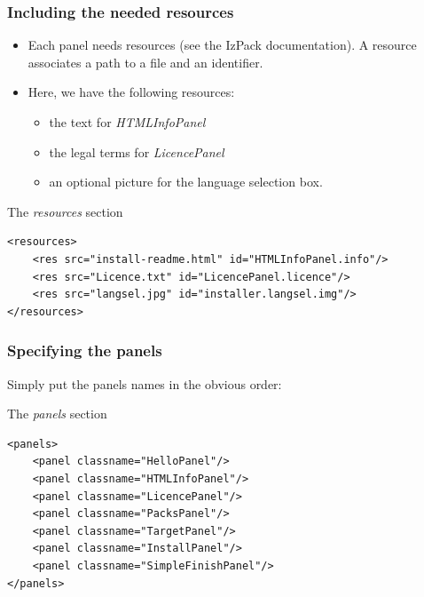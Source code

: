 \documentclass[compress,10pt]{beamer}
\begin{document}

\begin{frame}[containsverbatim]

\frametitle{Including the needed resources}

\begin{itemize}

  \item Each panel needs resources (see the IzPack documentation). A resource
  associates a path to a file and an identifier.

  \item Here, we have the following resources:
    \begin{itemize}
      \item the text for \textsl{HTMLInfoPanel}
      \item the legal terms for \textsl{LicencePanel}
      \item an optional picture for the language selection box.
    \end{itemize}

\end{itemize}

\begin{block}{The \textsl{resources} section}
\tiny
\begin{verbatim}
<resources>
    <res src="install-readme.html" id="HTMLInfoPanel.info"/>
    <res src="Licence.txt" id="LicencePanel.licence"/>
    <res src="langsel.jpg" id="installer.langsel.img"/>
</resources>
\end{verbatim}
\end{block}

\end{frame}


\begin{frame}[containsverbatim]

\frametitle{Specifying the panels}

Simply put the panels names in the obvious order:

\begin{block}{The \textsl{panels} section}
\tiny
\begin{verbatim}
<panels>
    <panel classname="HelloPanel"/>
    <panel classname="HTMLInfoPanel"/>
    <panel classname="LicencePanel"/>
    <panel classname="PacksPanel"/>
    <panel classname="TargetPanel"/>
    <panel classname="InstallPanel"/>
    <panel classname="SimpleFinishPanel"/>
</panels>
\end{verbatim}
\end{block}

\end{frame}
\end{document}
